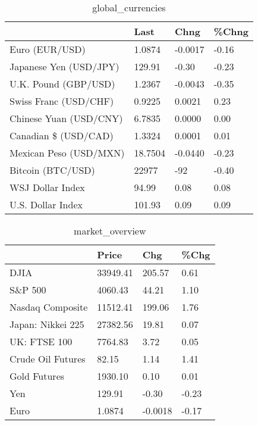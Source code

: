 \documentclass{article}%
\begin{document}
%


\begin{table}[htbp]%
\caption{global\_currencies}%
\centering%
\begin{adjustbox}{width=1\textwidth}%
\begin{tabular}{llll}
\toprule
                       &    Last &    Chng & \%Chng \\
\midrule
        Euro (EUR/USD) &  1.0874 & -0.0017 & -0.16 \\
Japanese Yen (USD/JPY) &  129.91 &   -0.30 & -0.23 \\
  U.K. Pound (GBP/USD) &  1.2367 & -0.0043 & -0.35 \\
 Swiss Franc (USD/CHF) &  0.9225 &  0.0021 &  0.23 \\
Chinese Yuan (USD/CNY) &  6.7835 &  0.0000 &  0.00 \\
  Canadian \$ (USD/CAD) &  1.3324 &  0.0001 &  0.01 \\
Mexican Peso (USD/MXN) & 18.7504 & -0.0440 & -0.23 \\
     Bitcoin (BTC/USD) &   22977 &     -92 & -0.40 \\
      WSJ Dollar Index &   94.99 &    0.08 &  0.08 \\
     U.S. Dollar Index &  101.93 &    0.09 &  0.09 \\
\bottomrule
\end{tabular}
%
\end{adjustbox}%
\end{table}

%


\begin{table}[htbp]%
\caption{market\_overview}%
\centering%
\begin{adjustbox}{width=1\textwidth}%
\begin{tabular}{llll}
\toprule
                  &    Price &     Chg &  \%Chg \\
\midrule
             DJIA & 33949.41 &  205.57 &  0.61 \\
          S\&P 500 &  4060.43 &   44.21 &  1.10 \\
 Nasdaq Composite & 11512.41 &  199.06 &  1.76 \\
Japan: Nikkei 225 & 27382.56 &   19.81 &  0.07 \\
     UK: FTSE 100 &  7764.83 &    3.72 &  0.05 \\
Crude Oil Futures &    82.15 &    1.14 &  1.41 \\
     Gold Futures &  1930.10 &    0.10 &  0.01 \\
              Yen &   129.91 &   -0.30 & -0.23 \\
             Euro &   1.0874 & -0.0018 & -0.17 \\
\bottomrule
\end{tabular}
%
\end{adjustbox}%
\end{table}

%
\end{document}
